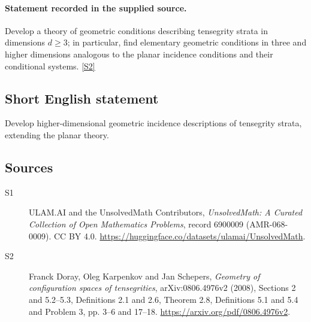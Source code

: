 \documentclass[11pt]{article}
\newcommand{\sref}[2]{\hyperlink{source:#1:#2}{[S#2]}}
\begin{document}
\paragraph{Statement recorded in the supplied source.}
Develop a theory of geometric conditions describing tensegrity strata in dimensions $d\geq3$; in particular, find elementary geometric conditions in three and higher dimensions analogous to the planar incidence conditions and their conditional systems. \sref{6900009}{2}
\subsection{Short English statement}
Develop higher-dimensional geometric incidence descriptions of tensegrity strata, extending the planar theory.
\subsection{Sources}
\begin{description}
\item[\hypertarget{source:6900009:1}{S1}] ULAM.AI and the UnsolvedMath Contributors, \emph{UnsolvedMath: A Curated Collection of Open Mathematics Problems}, record 6900009 (AMR-068-0009). CC BY 4.0. \url{https://huggingface.co/datasets/ulamai/UnsolvedMath}.
\item[\hypertarget{source:6900009:2}{S2}] Franck Doray, Oleg Karpenkov and Jan Schepers, \emph{Geometry of configuration spaces of tensegrities}, arXiv:0806.4976v2 (2008), Sections 2 and 5.2--5.3, Definitions 2.1 and 2.6, Theorem 2.8, Definitions 5.1 and 5.4 and Problem 3, pp. 3--6 and 17--18. \url{https://arxiv.org/pdf/0806.4976v2}.
\end{description}
\label{end:6900009}
\end{document}
